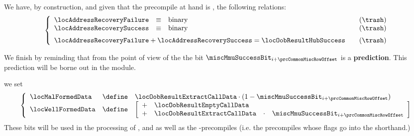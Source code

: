 \begin{description}
\begin{description}
\begin{description}
						\saNote{} We have, by construction, and given that the precompile at hand is , the following relations:
						\[
							\left\{ \begin{array}{lclr}
								\locAddressRecoveryFailure   & \equiv & \text{binary} & \quad (\trash) \\
								\locAddressRecoverySuccess   & \equiv & \text{binary} & \quad (\trash) \vspace{2mm} \\
								\multicolumn{3}{l}{\locAddressRecoveryFailure + \locAddressRecoverySuccess = \locOobResultHubSuccess} & \quad (\trash) \\
							\end{array} \right.
						\]

						\saNote{} We finish by reminding that from the point of view of the \hubMod{} the bit $\miscMmuSuccessBit_{i + \prcCommonMiscRowOffset}$ is a \textbf{prediction}.
						This prediction will be borne out in the \ecDataMod{} module.
					\item[\underline{\inst{ECADD}, \inst{ECMUL} and \inst{ECPAIRING} as well as \inst{BLS}-precompile specific:}]
						we set
						\[
							\left\{ \begin{array}{lcl}
								\locMalFormedData  & \define & \locOobResultExtractCallData \cdot (1 - \miscMmuSuccessBit_{i + \prcCommonMiscRowOffset}) \\
								\locWellFormedData & \define & 
								\left[ \begin{array}{clcl}
									+ & \locOobResultEmptyCallData                                        \\
									+ & \locOobResultExtractCallData & \cdot & \miscMmuSuccessBit_{i + \prcCommonMiscRowOffset} \\
								\end{array} \right] \\
							\end{array} \right.
						\]
						\saNote{}
						These bits will be used in the processing of ,  and 
						as well as the -precompiles (i.e. the precompiles whose flags go into the \scenPrecompileCommonBls{} shorthand.)


\end{description}
\end{description}
\end{description}
